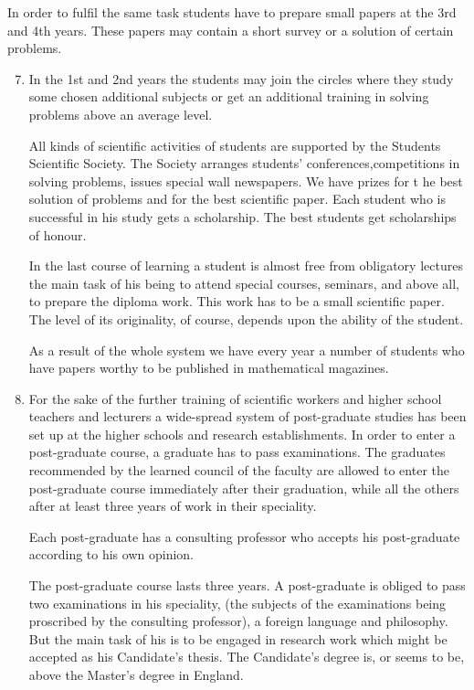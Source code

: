 In order to fulfil the same task students have to prepare small papers at the 3rd and 4th years. These papers may contain a short survey or a solution of certain problems.
\begin{enumerate}
\setcounter{enumi}{6}
\item In the 1st and 2nd years the students may join the circles where they study some chosen additional subjects or get an additional training in solving problems above an average level.

All kinds of scientific activities of students are supported by the Students Scientific Society. The Society arranges students' conferences,\pageoriginale competitions in solving problems, issues special wall newspapers. We have prizes for t he best solution of problems and for the best scientific paper. Each student who is successful in his study gets a scholarship. The best students get scholarships of honour.

In the last course of learning a student is almost free from obligatory lectures the main task of his being to attend special courses, seminars, and above all, to prepare the diploma work. This work has to be a small scientific paper. The level of its originality, of course, depends upon the ability of the student.

As a result of the whole system we have every year a number of students who have papers worthy to be published in mathematical magazines.

\item For the sake of the further training of scientific workers and higher school teachers and lecturers a wide-spread system of post-graduate studies has been set up at the higher schools and research establishments. In order to enter a post-graduate course, a graduate has to pass examinations. The graduates recommended by the learned council of the faculty are allowed to enter the post-graduate course immediately after their graduation, while all the others after at least three years of work in their speciality.

Each post-graduate has a consulting professor who accepts his post-graduate according to his own opinion.

The post-graduate course lasts three years. A post-graduate is obliged to pass two examinations in his speciality, (the subjects of the examinations being proscribed by the consulting professor), a foreign language and philosophy. But the main task of his is to be engaged in research work which might be accepted as his Candidate's thesis. The Candidate's degree is, or seems to be, above the Master's degree in England.


\end{enumerate}
